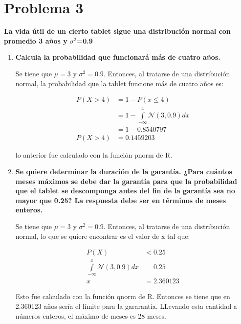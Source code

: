 \section*{Problema 3}
\textbf{La vida útil de un cierto tablet sigue una distribución normal con promedio 3 años y $\sigma^2$=0.9}

\begin{enumerate}
    \item \textbf{Calcula la probabilidad que funcionará más de cuatro años.}

          Se tiene que $\mu=3$ y $\sigma^2=0.9$. Entonces, al tratarse de una distribución normal, la probabilidad que la tablet funcione más de cuatro años es:

          \begin{align*}
              P(X>4) & = 1 - P(x\leq 4)                                    \\
                     & = 1 - \int\limits_{-\infty}^4 \mathcal{N} (3,0.9)dx \\
                     & = 1 - 0.8540797                                     \\
              P(X>4) & = 0.1459203
          \end{align*}

          lo anterior fue calculado con la función pnorm de R.

    \item \textbf{Se quiere determinar la duración de la garantía. ¿Para cuántos meses máximos se debe dar la garantía para que la probabilidad que el tablet se descomponga antes del fin de la garantía sea no mayor que 0.25? La respuesta debe ser en términos de meses enteros.}

          Se tiene que $\mu=3$ y $\sigma^2=0.9$. Entonces, al tratarse de una distribución normal, lo que se quiere encontrar es el valor de x tal que:

          \begin{align*}
              P(X)                                          & <0.25      \\
              \int\limits_{-\infty}^x \mathcal{N} (3,0.9)dx & = 0.25     \\
              x                                             & = 2.360123
          \end{align*}

          Esto fue calculado con la función qnorm de R. Entonces se tiene que en 2.360123 años sería el límite para la gararantía. LLevando esta cantidad a números enteros, el máximo de meses es 28 meses.
\end{enumerate}